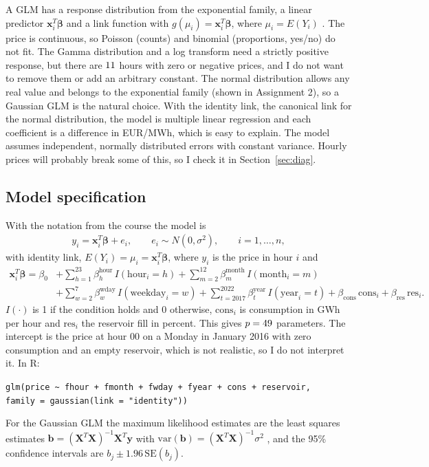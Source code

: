 \documentclass[12pt]{article}
\newcommand{\bs}[1]{\boldsymbol{#1}}
\newcommand{\eur}{EUR/MWh}
\begin{document}
A GLM has a response distribution from the exponential family, a linear predictor $\bs{x}_i^T\bs{\beta}$ and a link function with $g(\mu_i) = \bs{x}_i^T\bs{\beta}$, where $\mu_i = E(Y_i)$ \parencite{dobson2008glm}. The price is continuous, so Poisson (counts) and binomial (proportions, yes/no) do not fit. The Gamma distribution and a log transform need a strictly positive response, but there are $11$ hours with zero or negative prices, and I do not want to remove them or add an arbitrary constant. The normal distribution allows any real value and belongs to the exponential family (shown in Assignment 2), so a Gaussian GLM is the natural choice. With the identity link, the canonical link for the normal distribution, the model is multiple linear regression and each coefficient is a difference in \eur, which is easy to explain. The model assumes independent, normally distributed errors with constant variance. Hourly prices will probably break some of this, so I check it in Section~\ref{sec:diag}.

\subsection{Model specification}

With the notation from the course the model is
\begin{align*}
y_i = \bs{x}_i^T\bs{\beta} + e_i, \qquad e_i \sim N(0, \sigma^2), \qquad i = 1, \dots, n,
\end{align*}
with identity link, $E(Y_i) = \mu_i = \bs{x}_i^T\bs{\beta}$, where $y_i$ is the price in hour $i$ and
\begin{align*}
\bs{x}_i^T\bs{\beta} = \beta_0
&+ \sum_{h=1}^{23} \beta^{\text{hour}}_h\, I(\text{hour}_i = h)
+ \sum_{m=2}^{12} \beta^{\text{month}}_m\, I(\text{month}_i = m) \\
&+ \sum_{w=2}^{7} \beta^{\text{wday}}_w\, I(\text{weekday}_i = w)
+ \sum_{t=2017}^{2022} \beta^{\text{year}}_t\, I(\text{year}_i = t)
+ \beta_{\text{cons}}\, \text{cons}_i + \beta_{\text{res}}\, \text{res}_i.
\end{align*}
$I(\cdot)$ is 1 if the condition holds and 0 otherwise, $\text{cons}_i$ is consumption in GWh per hour and $\text{res}_i$ the reservoir fill in percent. This gives $p = 49$ parameters. The intercept is the price at hour 00 on a Monday in January 2016 with zero consumption and an empty reservoir, which is not realistic, so I do not interpret it. In R:
\begin{displayquote}
\small\raggedright
\texttt{glm(price \textasciitilde{} fhour + fmonth + fwday + fyear + cons + reservoir,}\\
\texttt{\phantom{glm(}family = gaussian(link = "identity"))}
\end{displayquote}
For the Gaussian GLM the maximum likelihood estimates are the least squares estimates $\bs{b} = (\bs{X}^T\bs{X})^{-1}\bs{X}^T\bs{y}$ with $\mathrm{var}(\bs{b}) = (\bs{X}^T\bs{X})^{-1}\sigma^2$ \parencite{dobson2008glm}, and the 95\% confidence intervals are $b_j \pm 1.96\,\mathrm{SE}(b_j)$.
\end{document}
